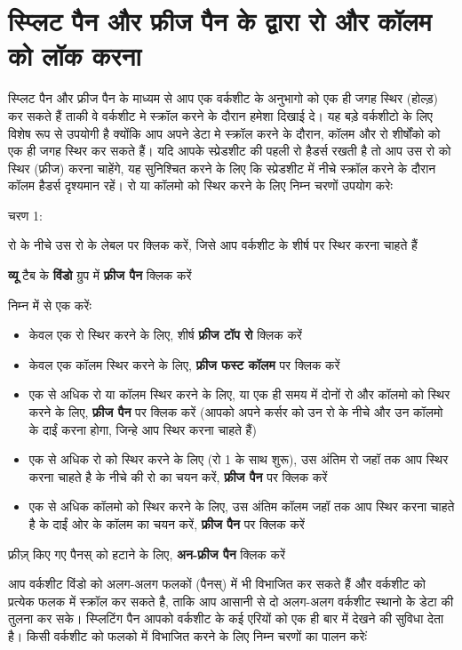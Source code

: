 \section{स्प्लिट पैन और फ्रीज पैन के द्वारा रो और कॉलम को लॉक करना}\label{id-1.38}

स्प्लिट पैन और फ्रीज पैन के माध्यम से आप एक वर्कशीट के अनुभागो को एक ही जगह स्थिर (होल्ड़) कर सकते हैं ताकी वे वर्कशीट मे स्क्रॉल करने के दौरान हमेशा दिखाई दे। यह बड़े वर्कशीटो के लिए विशेष रूप से उपयोगी है क्योंकि आप अपने डेटा मे स्क्रॉल करने के दौरान, कॉलम और रो शीर्षोंको को एक ही जगह स्थिर कर सकते हैं। यदि आपके स्प्रेडशीट की पहली रो हैडर्स रखती है तो आप उस रो को स्थिर (फ्रीज) करना चाहेंगे, यह सुनिश्चित करने के लिए कि स्प्रेडशीट में नीचे स्क्रॉल करने के दौरान कॉलम हैडर्स दृश्यमान रहें। रो या कॉलमो को स्थिर करने के लिए निम्न चरणों उपयोग करेः 

\begin{descriptionSimple}{चरण 1:}
\item[चरण 1] रो के नीचे उस रो के लेबल पर क्लिक करें, जिसे आप वर्कशीट के शीर्ष पर स्थिर करना चाहते हैं
\item[चरण 2] \textbf{व्यू} टैब के \textbf{विंडो} ग्रुप में \textbf{फ्रीज पैन} क्लिक करें
\item[चरण 3] निम्न में से एक करेंः
		\begin{itemize}
		\item केवल एक रो स्थिर करने के लिए, शीर्ष \textbf{फ्रीज टॉप रो} क्लिक करें
		\item केवल एक कॉलम स्थिर करने के लिए, \textbf{फ्रीज फस्ट कॉलम} पर क्लिक करें
		\item एक से अधिक रो या कॉलम स्थिर करने के लिए, या एक ही समय में दोनों रो और कॉलमो को स्थिर करने के लिए, \textbf{फ्रीज पैन} पर क्लिक करें (आपको अपने कर्सर को उन रो के नीचे और उन कॉलमो के दाईं करना होगा, जिन्हे आप स्थिर करना चाहते हैं)
		\item एक से अधिक रो को स्थिर करने के लिए (रो 1 के साथ शुरू), उस अंतिम रो जहॉ तक आप स्थिर करना चाहते है के नीचे की रो का चयन करें, \textbf{फ्रीज पैन} पर क्लिक करें
		\item एक से अधिक कॉलमो को स्थिर करने के लिए, उस अंतिम कॉलम जहॉ तक आप स्थिर करना चाहते है के दाईं ओर के कॉलम का चयन करें, \textbf{फ्रीज पैन} पर क्लिक करें
		\end{itemize}
\item[चरण 4] फ्रीज़् किए गए पैनस् को हटाने के लिए, \textbf{अन-फ्रीज पैन} क्लिक करें
\end{descriptionSimple}

आप वर्कशीट विंडो को अलग-अलग फलकों (पैनस्) में भी विभाजित कर सकते हैं और वर्कशीट को प्रत्येक फलक में स्क्रॉल कर सकते है, ताकि आप आसानी से दो अलग-अलग वर्कशीट स्थानो केे डेटा की तुलना कर सके। स्प्लिटिंग पैन आपको वर्कशीट के कई एरियों को एक ही बार में देखने की सुविधा देता है। किसी वर्कशीट को फलको में विभाजित करने के लिए निम्न चरणों का पालन करेःं

